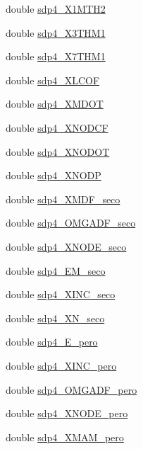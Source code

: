 \begin{DoxyCompactItemize}
\item 
double \hyperlink{structsdp4__data_a7bd4f5f48657acaeb02ecd2b06543f7c}{sdp4\-\_\-\-X1\-M\-T\-H2}
\item 
double \hyperlink{structsdp4__data_ac2822d28386168be52e61de132419d35}{sdp4\-\_\-\-X3\-T\-H\-M1}
\item 
double \hyperlink{structsdp4__data_a04fc61c6b73948f030f0cba20af2a0b9}{sdp4\-\_\-\-X7\-T\-H\-M1}
\item 
double \hyperlink{structsdp4__data_a6262addda0a9c7c6f18e228fe56928d1}{sdp4\-\_\-\-X\-L\-C\-O\-F}
\item 
double \hyperlink{structsdp4__data_a6506c7b244edd99ce4592fdc285e22a5}{sdp4\-\_\-\-X\-M\-D\-O\-T}
\item 
double \hyperlink{structsdp4__data_ad30aed7cb81995cbec5b8a860e1f1464}{sdp4\-\_\-\-X\-N\-O\-D\-C\-F}
\item 
double \hyperlink{structsdp4__data_ad37f4d07e3a60b7b59fcfb2de095da4f}{sdp4\-\_\-\-X\-N\-O\-D\-O\-T}
\item 
double \hyperlink{structsdp4__data_ac869c664fde599dc5c467568d0ab4974}{sdp4\-\_\-\-X\-N\-O\-D\-P}
\item 
double \hyperlink{structsdp4__data_a5c90a848d6bdf6beb3a766d77e0e250c}{sdp4\-\_\-\-X\-M\-D\-F\-\_\-seco}
\item 
double \hyperlink{structsdp4__data_a0f1710142828c31b1ed8932b5827a3e2}{sdp4\-\_\-\-O\-M\-G\-A\-D\-F\-\_\-seco}
\item 
double \hyperlink{structsdp4__data_a5290f14b682ec0da52423219dfb4ce49}{sdp4\-\_\-\-X\-N\-O\-D\-E\-\_\-seco}
\item 
double \hyperlink{structsdp4__data_a190d3f5e55a0d373252664f5733532c9}{sdp4\-\_\-\-E\-M\-\_\-seco}
\item 
double \hyperlink{structsdp4__data_a3f9d92fb7fd3af258a6e5e195aad4155}{sdp4\-\_\-\-X\-I\-N\-C\-\_\-seco}
\item 
double \hyperlink{structsdp4__data_a2d0154dbe278519f871ff5d726a095b1}{sdp4\-\_\-\-X\-N\-\_\-seco}
\item 
double \hyperlink{structsdp4__data_a931df30aad000edfe6d749a7f973b72f}{sdp4\-\_\-\-E\-\_\-pero}
\item 
double \hyperlink{structsdp4__data_a6c35626ec01910d7ef0a51aff58412ea}{sdp4\-\_\-\-X\-I\-N\-C\-\_\-pero}
\item 
double \hyperlink{structsdp4__data_a9f123c63a37702abd13863ce502113a9}{sdp4\-\_\-\-O\-M\-G\-A\-D\-F\-\_\-pero}
\item 
double \hyperlink{structsdp4__data_aec215e13e431b1db9b8c4acd16d7741c}{sdp4\-\_\-\-X\-N\-O\-D\-E\-\_\-pero}
\item 
double \hyperlink{structsdp4__data_a4db782ac5e3b58c51f2aeb4af4793de8}{sdp4\-\_\-\-X\-M\-A\-M\-\_\-pero}
\end{DoxyCompactItemize}


